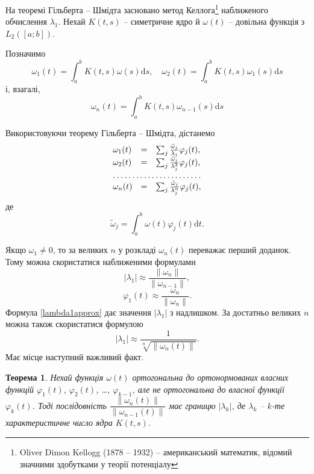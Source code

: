 \documentclass[14pt,twoside]{extreport}
\theoremstyle{mystyle}
\newtheorem{thm}{Теорема}
\numberwithin{equation}{chapter}
\begin{document}
На теоремі Гільберта -- Шмідта засновано метод Келлога\footnote{Oliver Dimon Kellogg (1878 -- 1932) -- американський математик, відомий значними здобутками у теорії потенціалу} наближеного обчислення $\lambda_1$. Нехай $K(t, s)$ -- симетричне ядро й $\omega(t)$ -- довільна функція з $L_2([a; b])$.

Позначимо
\[
\omega_1(t) = \int_{a}^{b} K(t, s) \omega(s) \mathrm{d}s,\quad \omega_2(t) = \int_{a}^{b} K(t, s) \omega_1(s) \mathrm{d}s
\]
і, взагалі,
\[
\omega_n(t) = \int_{a}^{b} K(t, s) \omega_{n-1}(s) \mathrm{d}s
\]

Використовуючи теорему Гільберта -- Шмідта, дістанемо
\begin{equation*}
\begin{array}{lll}
\omega_1(t) &=& \sum_{j} \frac{\tilde{\omega}_j}{\lambda_j}\varphi_j(t),\\
\omega_2(t) &=& \sum_{j} \frac{\tilde{\omega}_j}{\lambda_j^2}\varphi_j(t),\\
\hdotsfor{3}\\
\omega_n(t) &=& \sum_{j} \frac{\tilde{\omega}_j}{\lambda_j^n}\varphi_j(t),
\end{array}
\end{equation*}
де
\[
\tilde{\omega}_j = \int_{a}^{b} \omega(t) \varphi_j(t) \mathrm{d}t.
\]

Якщо $\omega_1 \neq 0$, то за великих $n$ у розкладі $\omega_n(t)$ переважає перший доданок. Тому можна скористатися наближеними формулами
\begin{equation}\label{lambda1approx}
|\lambda_1| \approx \frac{\|\omega_n\|}{\|\omega_{n-1}\|},
\end{equation}
\begin{equation}
\varphi_1(t) \approx \frac{\omega_n}{\|\omega_{n}\|}.
\end{equation}
Формула \eqref{lambda1approx} дає значення $|\lambda_1|$ з надлишком. За достатньо великих $n$ можна також скористатися формулою
\begin{equation}
|\lambda_1|\approx \dfrac{1}{\sqrt[n]{\|\omega_n(t)\|}}.
\end{equation}
Має місце наступний важливий факт.
\begin{thm}
	Нехай функція $\omega(t)$ ортогональна до ортонормованих власних функцій $\varphi_1(t)$, $\varphi_2(t)$, \ldots, $\varphi_{k-1}$, але не ортогональна до власної функції $\varphi_k(t)$. Тоді послідовність $\dfrac{\|\omega_n(t)\|}{\|\omega_{n-1}(t)\|}$ має границю $|\lambda_k|$, де $\lambda_k$ -- $k$-те характеристичне число ядра $K(t, s)$.
\end{thm}
\end{document}
